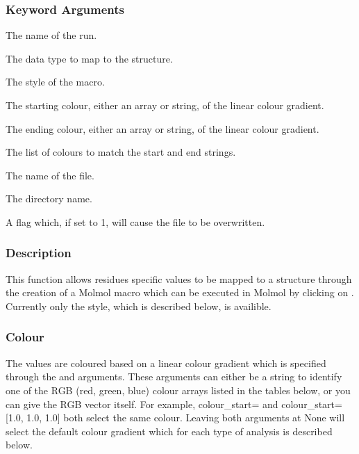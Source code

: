  
 \subsubsection{Keyword Arguments} 

   The name of the run.   

   The data type to map to the structure.   

   The style of the macro.   

   The starting colour, either an array or string, of the linear colour gradient.   

   The ending colour, either an array or string, of the linear colour gradient.   

   The list of colours to match the start and end strings.   

   The name of the file.   

   The directory name.   

   A flag which, if set to 1, will cause the file to be overwritten.  

  

  
 \subsubsection{Description} 

 This function allows residues specific values to be mapped to a structure through the creation of a Molmol  macro which can be executed in Molmol by clicking on .  Currently only the  style, which is described below, is availible. 
  

  
 \subsubsection{Colour} 

 The values are coloured based on a linear colour gradient which is specified through the  and  arguments.  These arguments can either be a string to identify one of the RGB (red, green, blue) colour arrays listed in the tables below, or you can give the RGB vector itself.  For example, colour\_start= and colour\_start=[1.0, 1.0, 1.0] both select the same colour.  Leaving both arguments at None will select the default colour gradient which for each type of analysis is described below. 
  

